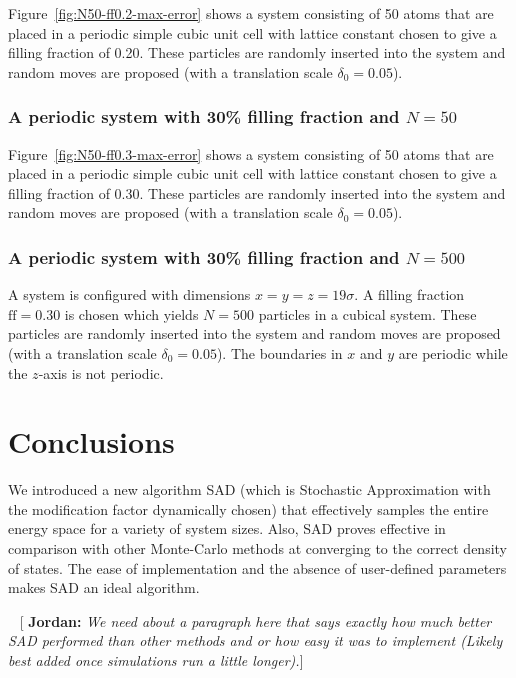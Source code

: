\documentclass[letterpaper,twocolumn,amsmath,amssymb,pre,aps,10pt]{revtex4-1}
\newcommand{\blue}[1]{{\bf \color{blue} #1}}
\newcommand{\jpsays}[1]{{\color{red} [\blue{Jordan:} \emph{#1}]}}
\begin{document}
Figure~\ref{fig:N50-ff0.2-max-error} shows a system consisting of 50 atoms
that are placed in a periodic simple cubic unit cell with lattice constant
chosen to give a filling fraction of 0.20.  These particles are
randomly inserted into the system and random moves are proposed (with
a translation scale $\delta_0 = 0.05$).

\subsubsection{A periodic system with 30\% filling fraction and $N = 50$}

Figure~\ref{fig:N50-ff0.3-max-error} shows a system consisting of 50 atoms
that are placed in a periodic simple cubic unit cell with lattice constant
chosen to give a filling fraction of 0.30.  These particles are
randomly inserted into the system and random moves are proposed (with
a translation scale $\delta_0 = 0.05$).

\subsubsection{A periodic system with 30\% filling fraction and $N = 500$}

A system is configured with dimensions $x = y = z = 19\sigma$.  A
filling fraction $\text{ff} = 0.30$ is chosen which yields $N = 500$
particles in a cubical system.  These particles are randomly inserted
into the system and random moves are proposed (with a translation scale
$\delta_0 = 0.05$). The boundaries in $x$ and $y$ are periodic while
the $z$-axis is not periodic.

\section{Conclusions}

We introduced a new algorithm SAD (which is Stochastic Approximation
with the modification factor dynamically chosen) that effectively
samples the entire energy space for a variety of system sizes.  Also,
SAD proves effective in comparison with other Monte-Carlo methods at
converging to the correct density of states.  The ease of
implementation and the absence of user-defined parameters makes SAD an
ideal algorithm.

~\jpsays{We need about a paragraph here that says exactly how much
better SAD performed than other methods and or how easy it was to
implement (Likely best added once simulations run a little longer).}
\end{document}
